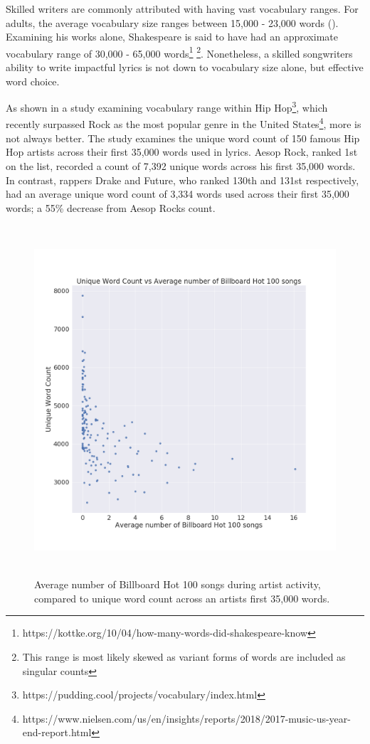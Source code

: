 \noindent
\newline
Skilled writers are commonly attributed with having vast vocabulary ranges. For adults, the average vocabulary size ranges between 15,000 - 23,000 words (\cite{McCrum2011}). Examining his works alone, Shakespeare is said to have had an approximate vocabulary range of 30,000 - 65,000 words\footnote{https://kottke.org/10/04/how-many-words-did-shakespeare-know} \footnote{This range is most likely skewed as variant forms of words are included as singular counts}. Nonetheless, a skilled songwriters ability to write impactful lyrics is not down to vocabulary size alone, but effective word choice.
 
\noindent
\newline
As shown in a study examining vocabulary range within Hip Hop\footnote{https://pudding.cool/projects/vocabulary/index.html}, which recently surpassed Rock as the most popular genre in the United States\footnote{https://www.nielsen.com/us/en/insights/reports/2018/2017-music-us-year-end-report.html}, more is not always better. The study examines the unique word count of 150 famous Hip Hop artists across their first 35,000 words used in lyrics. Aesop Rock, ranked 1st on the list, recorded a count of 7,392 unique words across his first 35,000 words. In contrast, rappers Drake and Future, who ranked 130th and 131st respectively, had an average unique word count of 3,334 words used across their first 35,000 words; a 55\% decrease from Aesop Rocks count. 
\begin{figure}[h]	
	\includegraphics[width=13cm, height=13cm]{./figures/fig1}
	\centering
	\caption[Average Number of Billboard Hot 100 songs vs Unique Word Count]{Average number of Billboard Hot 100 songs during artist activity, compared to unique word count across an artists first 35,000 words.}
	\label{fig:fig1}
\end{figure}

